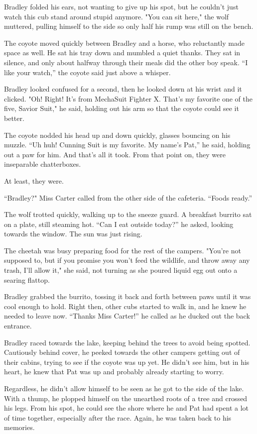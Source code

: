Bradley folded his ears, not wanting to give up his spot, but he
couldn't just watch this cub stand around stupid anymore. "You can sit
here," the wolf muttered, pulling himself to the side so only half his
rump was still on the bench.

The coyote moved quickly between Bradley and a horse, who reluctantly
made space as well. He sat his tray down and mumbled a quiet thanks.
They sat in silence, and only about halfway through their meals did the
other boy speak. ``I like your watch,'' the coyote said just above a
whisper.

Bradley looked confused for a second, then he looked down at his wrist
and it clicked. "Oh! Right! It's from MechaSuit Fighter X. That's my
favorite one of the five, Savior Suit," he said, holding out his arm so
that the coyote could see it better.

The coyote nodded his head up and down quickly, glasses bouncing on his
muzzle. ``Uh huh! Cunning Suit is my favorite. My name's Pat,'' he said,
holding out a paw for him. And that's all it took. From that point on,
they were inseparable chatterboxes.

At least, they were.

``Bradley?" Miss Carter called from the other side of the cafeteria.
``Foods ready.''

The wolf trotted quickly, walking up to the sneeze guard. A breakfast
burrito sat on a plate, still steaming hot. ``Can I eat outside today?''
he asked, looking towards the window. The sun was just rising.

The cheetah was busy preparing food for the rest of the campers. "You're
not supposed to, but if you promise you won't feed the wildlife, and
throw away any trash, I'll allow it," she said, not turning as she
poured liquid egg out onto a searing flattop.

Bradley grabbed the burrito, tossing it back and forth between paws
until it was cool enough to hold. Right then, other cubs started to walk
in, and he knew he needed to leave now. ``Thanks Miss Carter!'' he called
as he ducked out the back entrance.

Bradley raced towards the lake, keeping behind the trees to avoid being
spotted. Cautiously behind cover, he peeked towards the other campers
getting out of their cabins, trying to see if the coyote was up yet. He
didn't see him, but in his heart, he knew that Pat was up and probably
already starting to worry.

Regardless, he didn't allow himself to be seen as he got to the side of
the lake. With a thump, he plopped himself on the unearthed roots of a
tree and crossed his legs. From his spot, he could see the shore where
he and Pat had spent a lot of time together, especially after the race.
Again, he was taken back to his memories.

